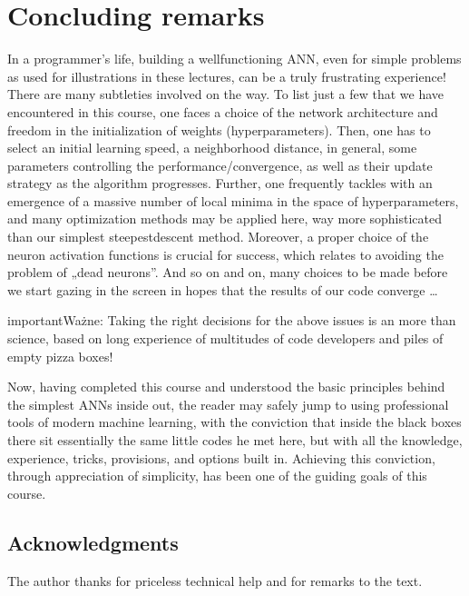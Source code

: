 \documentclass[a4paper,12pt,polish]{jupyterBook}
\begin{document}
\chapter{Concluding remarks}
\label{\detokenize{docs/conclusion:concluding-remarks}}\label{\detokenize{docs/conclusion::doc}}
\sphinxAtStartPar
In a programmer’s life, building a well\sphinxhyphen{}functioning ANN, even for simple problems as used for illustrations in these lectures, can be a truly frustrating experience! There are many subtleties involved on the way. To list just a few that we have encountered in this course, one faces a choice of the network architecture and freedom in the initialization of weights (hyperparameters). Then, one has to select an initial learning speed, a neighborhood distance, in general, some parameters controlling the performance/convergence, as well as their update strategy as the algorithm progresses. Further, one frequently tackles with an emergence of a massive number of local minima in the space of hyperparameters, and many optimization methods may be applied here, way more sophisticated than our simplest steepest\sphinxhyphen{}descent method. Moreover, a proper choice of the neuron activation functions is crucial for success, which relates to avoiding the problem of „dead neurons”. And so on and on, many choices to be made before we start gazing in the screen in hopes that the results of our code converge …

\begin{sphinxadmonition}{important}{Ważne:}
\sphinxAtStartPar
Taking the right decisions for the above issues is an  more than science, based on long experience of multitudes of code developers and piles of empty pizza boxes!
\end{sphinxadmonition}

\sphinxAtStartPar
Now, having completed this course and understood the basic principles behind the simplest ANNs inside out, the reader may safely jump to using professional tools of modern machine learning, with the conviction that inside the black boxes there sit essentially the same little codes he met here, but with all the knowledge, experience, tricks, provisions, and options built in. Achieving this conviction, through appreciation of simplicity, has been one of the guiding goals of this course.


\section{Acknowledgments}
\label{\detokenize{docs/conclusion:acknowledgments}}
\sphinxAtStartPar
The author thanks  for priceless technical help and for remarks to the text.
\end{document}
